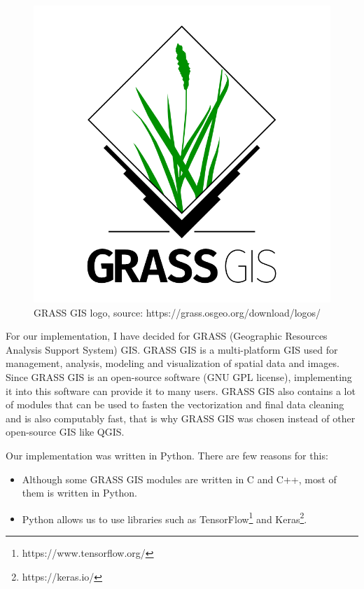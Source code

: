 \documentclass[journal, onecolumn, a4paper]{IEEEtran}
\begin{document}
\begin{figure}[h] \centering
	\includegraphics[scale=0.9]{grass-logo}
	\caption{GRASS GIS logo, source: https://grass.osgeo.org/download/logos/}
	\label{fig:grass-logo}
\end{figure}

For our implementation, I have decided for GRASS (Geographic Resources Analysis Support System) GIS. GRASS GIS is a multi-platform GIS used for management, analysis, modeling and visualization of spatial data and images. Since GRASS GIS is an open-source software (GNU GPL license), implementing it into this software can provide it to many users. GRASS GIS also contains a lot of modules that can be used to fasten the vectorization and final data cleaning and is also computably fast, that is why GRASS GIS was chosen instead of other open-source GIS like QGIS. 

Our implementation was written in Python. There are few reasons for this: 
\begin{itemize}
\item Although some GRASS GIS modules are written in C and C++, most of them is written in Python.
\item Python allows us to use libraries such as TensorFlow\footnote{https://www.tensorflow.org/} and Keras\footnote{https://keras.io/}. 
\end{itemize}
\end{document}
